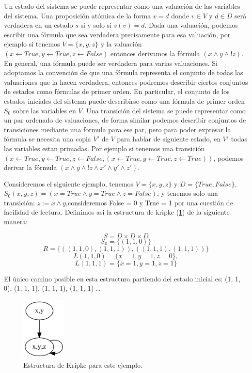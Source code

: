 Un estado del sistema se puede representar como una valuación de las variables del sistema. Una proposición atómica de la forma $v = d$ donde $v \in V$ y $d \in D$ será verdadera en un estado $s$ si y solo si $s(v) = d$.
Dada una valuación, podemos escribir una fórmula que sea verdadera precisamente para esa valuación, por ejemplo si tenemos $V = \{x,y,z\}$ y la valuación $(x \gets True, y \gets True, z \gets False)$ entonces derivamos la fórmula $(x \land y \land !z)$. En general, una fórmula puede ser verdadera para varias valuaciones. Si adoptamos la convención de que una fórmula representa el conjunto de todas las valuaciones que la hacen verdadera, entonces podremos describir ciertos conjuntos de estados como fórmulas de primer orden.
En particular, el conjunto de los estados iniciales del sistema puede describirse como una fórmula de primer orden $S_{0}$ sobre las variables en $V$.
Una transición del sistema se puede representar como un par ordenado de valuaciones, de forma similar podemos describir conjuntos de transiciones mediante una formula para ese par, pero para poder expresar la fórmula se necesita una copia $V'$ de $V$ para hablar de siguiente estado, en $V'$ todas las variables estan primadas. Por ejemplo si tenemos una transición $(x \gets True, y \gets True, z \gets False,(x \gets True, y \gets True, z \gets True))$, podemos derivar la fórmula $(x \land y \land !z \land x' \land y' \land z')$.

Consideremos el siguiente ejemplo, tenemos $V = \{x,y,z\}$ y $D = \{True, False\}$, $S_{0} (x,y,z) = (x= True \land y = True \land z = False)$, y tenemos solo una transición: $z := x \land y$,consideremos False = 0 y True = 1 por una cuestión de facilidad de lectura. Definimos asi la estructura de kripke (\ref{fig:kripke1})  de la siguiente manera:

\[S = D \times D \times D\]
\[S_{0} = \{(1, 1, 0)\}\]
\[R = \{((1, 1, 0), (1, 1, 1)), ((1, 1, 1), (1, 1, 1))\}\]
\[L (1, 1, 0) = \{x = 1, y = 1, z = 0\},\]
\[L (1, 1, 1) = \{x = 1, y = 1, z = 1\}\]

El único camino posible en esta estructura partiendo del estado inicial es: (1, 1, 0), (1, 1, 1), (1, 1, 1), (1, 1, 1) …

\begin{figure}[h!]
  \centering
  \includegraphics[width=0.2\textwidth]{Figures/kripke.png}
  \caption{Estructura de Kripke para este ejemplo.}
  \label{fig:kripke1}
\end{figure}

